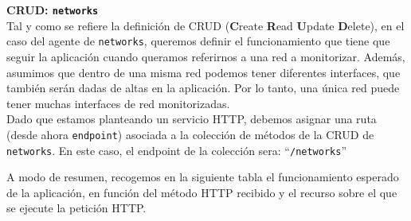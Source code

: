 \documentclass[a4paper, oneside, 12pt]{book}
\begin{document}
	\noindent \textbf{\large CRUD: \texttt{networks}} \\
	
	\noindent Tal y como se refiere la definición de CRUD (\textbf{C}reate \textbf{R}ead \textbf{U}pdate \textbf{D}elete), en el caso del agente de \texttt{networks}, queremos definir el funcionamiento que tiene que seguir la aplicación cuando queramos referirnos a una red a monitorizar. Además, asumimos que dentro de una misma red podemos tener diferentes interfaces, que también serán dadas de altas en la aplicación. Por lo tanto, una única red puede tener muchas interfaces de red monitorizadas. \\
	
	\noindent Dado que estamos planteando un servicio HTTP, debemos asignar una ruta (desde ahora \texttt{endpoint}) asociada a la colección de métodos de la CRUD de \texttt{networks}. En este caso, el endpoint de la colección sera: ``\texttt{/networks}''
	
	\pagebreak
	
	\noindent A modo de resumen, recogemos en la siguiente tabla el funcionamiento esperado de la aplicación, en función del método HTTP recibido y el recurso sobre el que se ejecute la petición HTTP.
	
\end{document}
